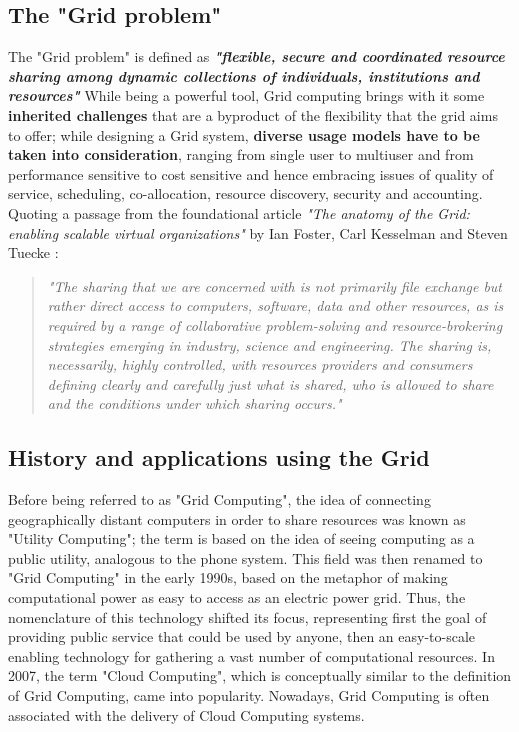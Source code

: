\subsection{The "Grid problem"}
The "Grid problem" is defined as \textbf{\textit{"flexible, secure and coordinated resource sharing among dynamic collections of individuals, institutions and resources"}} \cite{the_anatomy_of_the_grid}
 While being a powerful tool, Grid computing brings with it some \textbf{inherited challenges} that are a byproduct of the flexibility that the grid aims to offer; while designing a Grid system, \textbf{diverse usage models have to be taken into consideration}, ranging from single user to multiuser and from performance sensitive to cost sensitive and hence embracing issues of quality of service, scheduling, co-allocation, resource discovery, security and accounting.
 Quoting a passage from the foundational article \textit{"The anatomy of the Grid: enabling scalable virtual organizations"} by Ian Foster, Carl Kesselman and Steven Tuecke \cite{the_anatomy_of_the_grid}:
\begin{quotation}
    \textit{"The sharing that we are concerned with is not primarily file exchange but rather direct access to computers, software, data and other resources, as is required by a range of collaborative problem-solving and resource-brokering strategies emerging in industry, science and engineering. The sharing is, necessarily, highly controlled, with resources providers and consumers defining clearly and carefully just what is shared, who is allowed to share and the conditions under which sharing occurs."}
\end{quotation}


\subsection{History and applications using the Grid}
Before being referred to as "Grid Computing", the idea of connecting geographically distant computers in order to share resources was known as "Utility Computing"; the term is based on the idea of seeing computing as a public utility, analogous to the phone system. This field was then renamed to "Grid Computing" in the early 1990s, based on the metaphor of making computational power as easy to access as an electric power grid.
Thus, the nomenclature of this technology shifted its focus, representing first the goal of providing public service that could be used by anyone, then an easy-to-scale enabling technology for gathering a vast number of computational resources. In 2007, the term "Cloud Computing", which is conceptually similar to the definition of Grid Computing, came into popularity. Nowadays, Grid Computing is often associated with the delivery of Cloud Computing systems.
\vspace{5mm}

